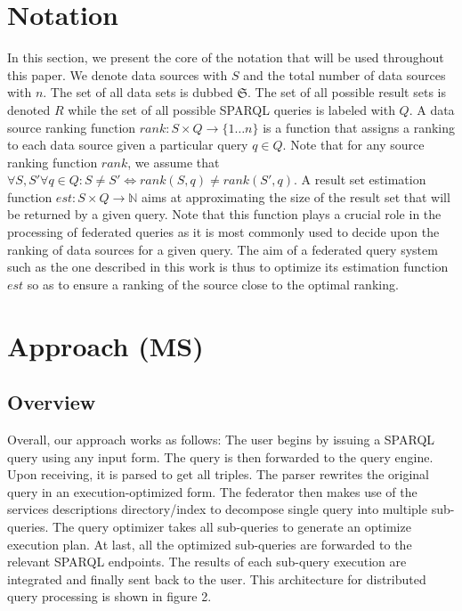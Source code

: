 \documentclass{sig-alternate}  %
\begin{document}
\section{Notation}
In this section, we present the core of the notation that will be used throughout this paper.
We denote data sources with $S$ and the total number of data sources with $n$. 
The set of all data sets is dubbed $\mathfrak{S}$.
The set of all possible result sets is denoted $R$ while the set of all possible SPARQL queries is labeled with $Q$. 
A data source ranking function $rank: S \times Q \rightarrow \{1 \ldots n\}$ is a function that assigns a ranking to each data source given a particular query $q \in Q$.
Note that for any source ranking function $rank$, we assume that $\forall S, S' \forall q \in Q : S  \neq S' \Longleftrightarrow rank(S, q) \neq rank (S', q)$.
A result set estimation function $est: S \times Q \rightarrow \mathbb{N}$ aims at approximating the size of the result set that will be returned by a given query.
Note that this function plays a crucial role in the processing of federated queries as it is most commonly used to decide upon the ranking of data sources for a given query.
The aim of a federated query system such as the one described in this work is thus to optimize its estimation function $est$ so as to ensure a ranking of the source close to the optimal ranking. %
\section{Approach (MS)}
\subsection{Overview}
 Overall, our approach works as follows: The user begins by issuing
a SPARQL query using any input form. The query is then forwarded to
the query engine. Upon receiving, it is parsed to get all triples.
The parser rewrites the original query in an execution-optimized
form. The federator then makes use of the services descriptions directory/index
to decompose single query into multiple sub-queries. The query optimizer
takes all sub-queries to generate an optimize execution plan. At last,
all the optimized sub-queries are forwarded to the relevant SPARQL
endpoints. The results of each sub-query execution are integrated and finally sent
back to the user. This architecture for distributed query processing
is shown in figure 2.
\end{document}
